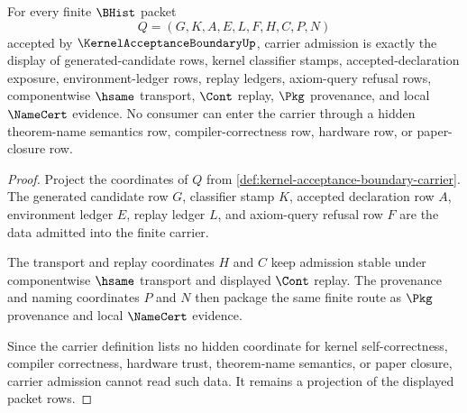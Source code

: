 \begin{theorem}
\label{thm:kernel-acceptance-boundary-carrier-admission}
For every finite $\BHist$ packet
$$
Q=(G,K,A,E,L,F,H,C,P,N)
$$
accepted by $\KernelAcceptanceBoundaryUp$, carrier admission is exactly the display of generated-candidate rows, kernel classifier stamps, accepted-declaration exposure, environment-ledger rows, replay ledgers, axiom-query refusal rows, componentwise $\hsame$ transport, $\Cont$ replay, $\Pkg$ provenance, and local $\NameCert$ evidence. No consumer can enter the carrier through a hidden theorem-name semantics row, compiler-correctness row, hardware row, or paper-closure row.
\end{theorem}
\begin{proof}
Project the coordinates of $Q$ from \autoref{def:kernel-acceptance-boundary-carrier}. The generated candidate row $G$, classifier stamp $K$, accepted declaration row $A$, environment ledger $E$, replay ledger $L$, and axiom-query refusal row $F$ are the data admitted into the finite carrier.

The transport and replay coordinates $H$ and $C$ keep admission stable under componentwise $\hsame$ transport and displayed $\Cont$ replay. The provenance and naming coordinates $P$ and $N$ then package the same finite route as $\Pkg$ provenance and local $\NameCert$ evidence.

Since the carrier definition lists no hidden coordinate for kernel self-correctness, compiler correctness, hardware trust, theorem-name semantics, or paper closure, carrier admission cannot read such data. It remains a projection of the displayed packet rows.
\end{proof}

